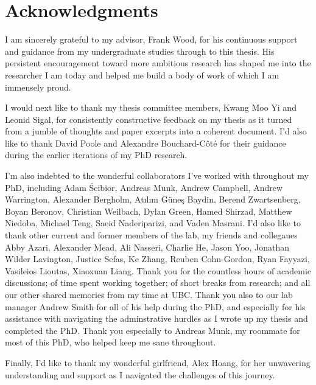 \chapter{Acknowledgments}

I am sincerely grateful to my advisor, Frank Wood, for his continuous support and guidance from my undergraduate studies through to this thesis. His persistent encouragement toward more ambitious research has shaped me into the researcher I am today and helped me build a body of work of which I am immensely proud.

I would next like to thank my thesis committee members, Kwang Moo Yi and Leonid Sigal, for consistently constructive feedback on my thesis as it turned from a jumble of thoughts and paper excerpts into a coherent document. I'd also like to thank David Poole and Alexandre Bouchard-Côté for their guidance during the earlier iterations of my PhD research.

I'm also indebted to the wonderful collaborators I've worked with throughout my PhD, including Adam Ścibior, Andreas Munk, Andrew Campbell, Andrew Warrington, Alexander Bergholm, Atılım Güneş Baydin, Berend Zwartsenberg, Boyan Beronov, Christian Weilbach, Dylan Green, Hamed Shirzad, Matthew Niedoba, Michael Teng, Saeid Naderiparizi, and Vaden Masrani. I'd also like to thank other current and former members of the lab, my friends and collegaues Abby Azari, Alexander Mead, Ali Nasseri, Charlie He, Jason Yoo, Jonathan Wilder Lavington, Justice Sefas, Ke Zhang, Reuben Cohn-Gordon, Ryan Fayyazi, Vasileios Lioutas, Xiaoxuan Liang. Thank you for the countless hours of academic discussions; of time spent working together; of short breaks from research; and all our other shared memories from my time at UBC. Thank you also to our lab manager Andrew Smith for all of his help during the PhD, and especially for his assistance with navigating the adminstrative hurdles as I wrote up my thesis and completed the PhD.  Thank you especially to Andreas Munk, my roommate for most of this PhD, who helped keep me sane throughout.

Finally, I'd like to thank my wonderful girlfriend, Alex Hoang, for her unwavering understanding and support as I navigated the challenges of this journey.